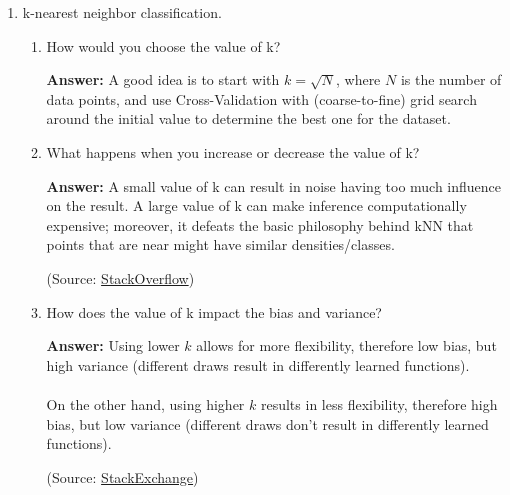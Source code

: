 \documentclass{article}
\newenvironment{QandA}{\begin{enumerate}[label=\arabic*.]}{\end{enumerate}}
\newenvironment{InnerQandA}{\begin{enumerate}[label=\roman*.]}{\end{enumerate}}
\newenvironment{answer}{\par\normalfont \textbf{Answer:}}{}
\begin{document}
\begin{QandA}
    \item k-nearest neighbor classification.
    \begin{InnerQandA}
        \item How would you choose the value of k?
        \begin{answer}
            A good idea is to start with $k = \sqrt{N}$, where $N$ is the number of data points, and use Cross-Validation with (coarse-to-fine) grid search around the initial value to determine the best one for the dataset.
        \end{answer}

        \item What happens when you increase or decrease the value of k?
        \begin{answer}
            A small value of k can result in noise having too much influence on the result. A large value of k can make inference computationally expensive; moreover, it defeats the basic philosophy behind kNN that points that are near might have similar densities/classes.  

            (Source: \href{https://stackoverflow.com/questions/11568897/value-of-k-in-k-nearest-neighbor-algorithm}{StackOverflow})
        \end{answer}

        \item How does the value of k impact the bias and variance?
        \begin{answer}
            Using lower $k$ allows for more flexibility, therefore low bias, but high variance (different draws result in differently learned functions).\\\\
            On the other hand, using higher $k$ results in less flexibility, therefore high bias, but low variance (different draws don't result in differently learned functions).
        
            (Source: \href{https://stats.stackexchange.com/questions/485884/bias-and-variance-in-knn-and-decision-trees}{StackExchange})
        \end{answer}
    \end{InnerQandA}


\end{QandA}
\end{document}
